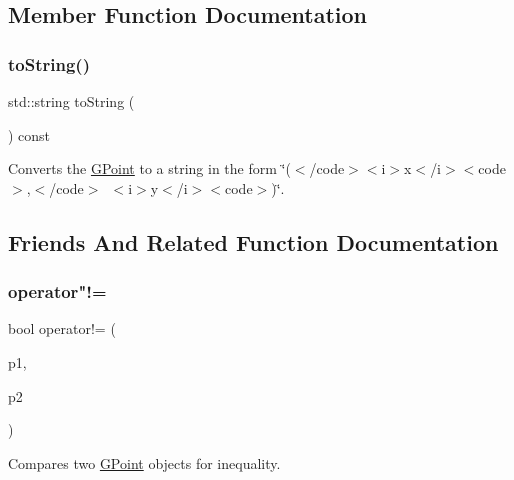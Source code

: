 \subsection{Member Function Documentation}
\mbox{\label{structsgl_1_1GPoint_a1fe5121d6528fdea3f243321b3fa3a49}} 
\subsubsection{\texorpdfstring{to\+String()}{toString()}}
{\footnotesize\ttfamily std\+::string to\+String (\begin{DoxyParamCaption}{ }\end{DoxyParamCaption}) const}



Converts the {\ttfamily \mbox{\hyperlink{structsgl_1_1GPoint}{G\+Point}}} to a string in the form {\ttfamily \char`\"{}($<$/code$>$$<$i$>$x$<$/i$>$$<$code$>$,$<$/code$>$~$<$i$>$y$<$/i$>$$<$code$>$)\char`\"{}}. 



\subsection{Friends And Related Function Documentation}
\mbox{\label{structsgl_1_1GPoint_add41464e7e2d69b7a90c72b16a7dbc6c}} 
\subsubsection{\texorpdfstring{operator"!=}{operator!=}}
{\footnotesize\ttfamily bool operator!= (\begin{DoxyParamCaption}\item[{const \mbox{\hyperlink{structsgl_1_1GPoint}{G\+Point}} \&}]{p1,  }\item[{const \mbox{\hyperlink{structsgl_1_1GPoint}{G\+Point}} \&}]{p2 }\end{DoxyParamCaption})\hspace{0.3cm}{\ttfamily [friend]}}



Compares two \mbox{\hyperlink{structsgl_1_1GPoint}{G\+Point}} objects for inequality. 

